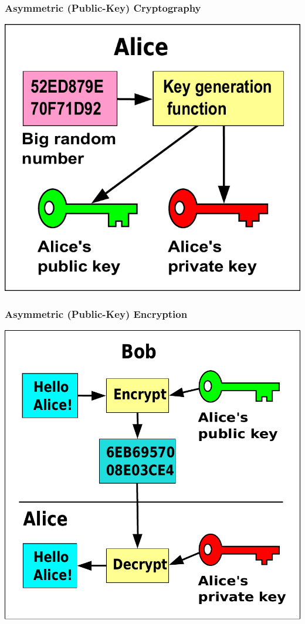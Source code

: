 \documentclass{beamer}
\begin{document}
\begin{frame}
  \frametitle{Asymmetric (Public-Key) Cryptography}

\includegraphics[height=0.5\textheight]{Public_key_making}

\end{frame}

\begin{frame}
  \frametitle{Asymmetric (Public-Key) Encryption}

\includegraphics[height=0.5\textheight]{Public_key_encryption}

\end{frame}
\end{document}
